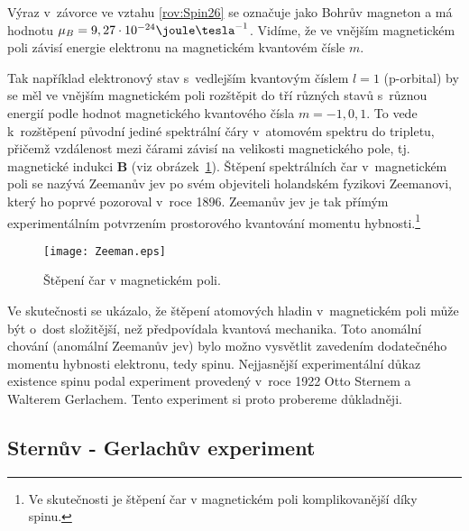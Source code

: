 \noindent Výraz v~závorce ve vztahu \eqref{rov:Spin26} se označuje jako Bohrův magneton a má hodnotu $\mu_B = 9,27 \cdot 10^{-24} \joule \tesla^{-1}$. Vidíme, že ve vnějším magnetickém poli závisí energie elektronu na magnetickém kvantovém čísle $m$.

Tak například elektronový stav s~vedlejším kvantovým číslem $l = 1$ (p-orbital) by se měl ve vnějším magnetickém poli rozštěpit do tří různých stavů s~různou energií podle hodnot magnetického kvantového čísla $m = -1, 0, 1$. To vede k~rozštěpení původní jediné spektrální čáry v~atomovém spektru do tripletu, přičemž vzdálenost mezi čárami závisí na velikosti magnetického pole, tj. magnetické indukci $\mathbf{B}$ (viz obrázek~\ref{obr:Zeeman}). Štěpení spektrálních čar v~magnetickém poli se nazývá Zeemanův jev po svém objeviteli holandském fyzikovi Zeemanovi, který ho poprvé pozoroval v~roce 1896. Zeemanův jev je tak přímým experimentálním potvrzením prostorového kvantování momentu hybnosti.\footnote{Ve skutečnosti je štěpení čar v magnetickém poli komplikovanější díky spinu.}

\begin{figure} [htb]
\centering
\texttt{[image: Zeeman.eps]}
\caption{Štěpení čar v magnetickém poli.}
\label{obr:Zeeman}
\end{figure}

Ve skutečnosti se ukázalo, že štěpení atomových hladin v~magnetickém poli může být o~dost složitější, než předpovídala kvantová mechanika. Toto  anomální chování (anomální Zeemanův jev) bylo možno vysvětlit zavedením dodatečného momentu hybnosti elektronu, tedy spinu. Nejjasnější experimentální důkaz existence spinu podal experiment provedený v~roce 1922 Otto Sternem a Walterem Gerlachem. Tento experiment si proto probereme důkladněji.    


\subsection{Sternův - Gerlachův experiment}
\label{kap:SG experiment}

